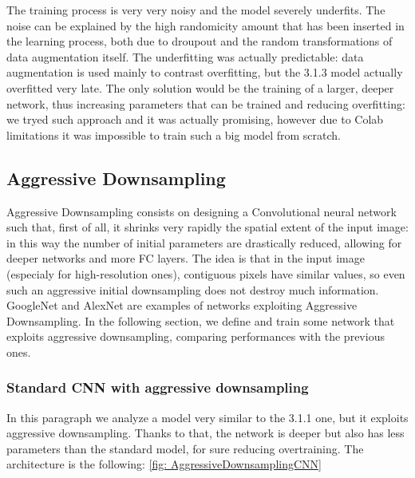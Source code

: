 \medskip

\noindent The training process is very very noisy and the model severely underfits. The noise can be explained by the high randomicity amount that has been inserted in the learning process, both due to droupout and the random transformations of data augmentation itself.
The underfitting was actually predictable: data augmentation is used mainly to contrast overfitting, but the 3.1.3 model actually overfitted very late.
The only solution would be the training of a larger, deeper network, thus increasing parameters that can be trained and reducing overfitting: we tryed such approach and it was actually promising, however due to Colab limitations it was impossible to train such a big model from scratch.


\subsection{Aggressive Downsampling}
Aggressive Downsampling consists on designing a Convolutional neural network such that, first of all, it shrinks very rapidly the spatial extent of the input image: in this way the number of initial parameters are drastically reduced, allowing for deeper networks and more FC layers. The idea is that in the input image (especialy for high-resolution ones), contiguous pixels have similar values, so even such an aggressive initial downsampling does not destroy much information. GoogleNet and AlexNet are examples of networks exploiting Aggressive Downsampling. In the following section, we define and train some network that exploits aggressive downsampling, comparing performances with the previous ones.

\subsubsection{Standard CNN with aggressive downsampling}
In this paragraph we analyze a model very similar to the 3.1.1 one, but it exploits aggressive downsampling. Thanks to that, the network is deeper but also has less parameters than the standard model, for sure reducing overtraining.
The architecture is the following: \ref{fig: AggressiveDownsamplingCNN}

